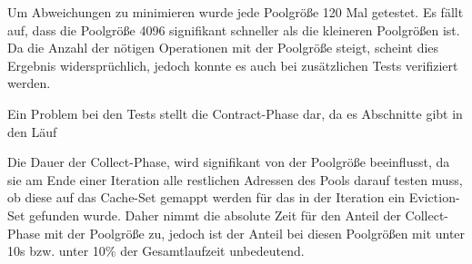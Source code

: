 Um Abweichungen zu minimieren wurde jede Poolgröße 120 Mal getestet.
Es fällt auf, dass die Poolgröße 4096 signifikant schneller als die kleineren Poolgrößen ist. 
Da die Anzahl der nötigen Operationen mit der Poolgröße steigt, scheint dies Ergebnis widersprüchlich, jedoch konnte es auch bei zusätzlichen Tests verifiziert werden.

Ein Problem bei den Tests stellt die Contract-Phase dar, da es Abschnitte gibt in den Läuf

Die Dauer der Collect-Phase, wird signifikant von der Poolgröße beeinflusst, da sie am Ende einer Iteration alle restlichen Adressen des Pools darauf testen muss, ob diese auf das Cache-Set gemappt werden für das in der Iteration ein Eviction-Set gefunden wurde.
Daher nimmt die absolute Zeit für den Anteil der Collect-Phase mit der Poolgröße zu, jedoch ist der Anteil bei diesen Poolgrößen mit unter 10s bzw. unter 10\% der Gesamtlaufzeit unbedeutend.









